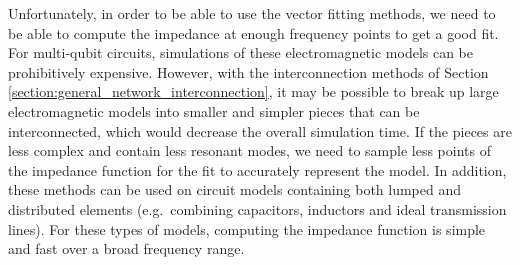 Unfortunately, in order to be able to use the vector fitting methods, we need to be able to compute the impedance at enough frequency points to get a good fit. For multi-qubit circuits, simulations of these electromagnetic models can be prohibitively expensive. However, with the interconnection methods of Section \ref{section:general_network_interconnection}, it may be possible to break up large electromagnetic models into smaller and simpler pieces that can be interconnected, which would decrease the overall simulation time. If the pieces are less complex and contain less resonant modes, we need to sample less points of the impedance function for the fit to accurately represent the model. In addition, these methods can be used on circuit models containing both lumped and distributed elements (e.g.\ combining capacitors, inductors and ideal transmission lines). For these types of models, computing the impedance function is simple and fast over a broad frequency range.


